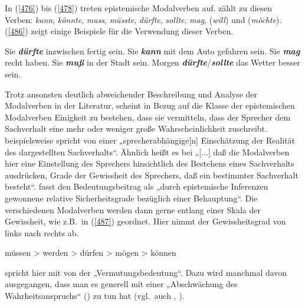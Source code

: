 In (\ref{476}) bis (\ref{478}) treten epistemische Modalverben  auf. \citet[26]{Mache2009} zählt zu diesen Verben: \textit{kann}, \textit{könnte}, \textit{muss}, \textit{müsste}, \textit{dürfte}, \textit{sollte}, \textit{mag}, (\textit{will}) und (\textit{möchte}). (\ref{486}) zeigt einige Beispiele für die Verwendung dieser Verben.
	
\begin{exe}
	\ex\label{486} 
		\begin{xlist}	
			\ex\label{486a} Sie \textit{\textbf{dürfte}} inzwischen fertig sein.
			\ex\label{486b} Sie \textbf{\textit{kann}} mit dem Auto gefahren sein.
			\ex\label{486c} Sie \textit{\textbf{mag}} recht haben.
			\ex\label{486d} Sie \textit{\textbf{muß}} in der Stadt sein.	
			\hfill\hbox{\citet[220]{Diewald1999b}}
			\ex\label{486e} Morgen \textit{\textbf{dürfte}}/\textit{\textbf{sollte}} das Wetter besser sein.			
		\end{xlist}
\end{exe}	
Trotz ansonsten deutlich abweichender Beschreibung und Analyse der Modalverben in der Literatur, scheint in Bezug auf die Klasse der epistemischen Modalverben  Einigkeit zu bestehen, dass sie vermitteln, dass der Sprecher dem Sachverhalt eine mehr oder weniger große Wahrscheinlichkeit zuschreibt. \citet[25]{Diewald1997} beispielsweise spricht von einer „sprecherabhängige[n] Einschätzung der Rea\-lität des dargestellten Sachverhalts“. Ähnlich heißt es bei \citet[28]{Oehlschlaeger1989} „[...] daß die Modalverben hier eine Einstellung des Sprechers hinsichtlich des Bestehens eines Sachverhalts ausdrücken, Grade der Gewissheit des Sprechers, daß ein bestimmter Sachverhalt besteht“. \citet[350]{Loetscher1991} fasst den Bedeutungsbeitrag als „durch epistemische Inferenzen gewonnene relative Sicherheitsgrade bezüglich einer Behauptung“. Die verschiedenen Modalverben werden dann gerne entlang einer Skala der Gewissheit, wie z.B.\ in (\ref{487}) geordnet. Hier nimmt der Gewissheitsgrad von links nach rechts ab. 

\begin{exe}
	\ex\label{487} 
	müssen > werden > dürfen > mögen > können
	\hfill\hbox{\citet[206]{Oehlschlaeger1989}}
\end{exe}
\citet[108]{Liedke2000} spricht hier mit \citet[21]{Buscha1981[1971]} von der „Vermutungsbedeutung“. Dazu wird manchmal davon ausgegangen, dass man es generell mit einer „Abschwächung des Wahrheitsanspruchs“ (\citealt[109]{Liedke2000}) zu tun hat (vgl.\ auch \citealt[222]{Diewald1993}, \citealt[205]{Diewald1999b}).

